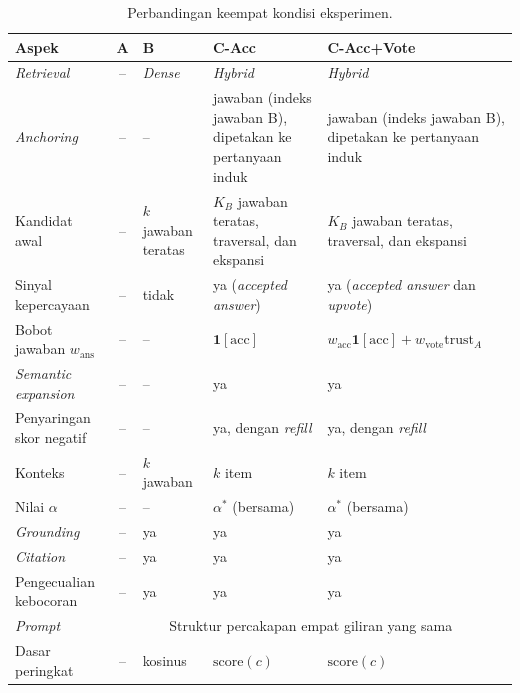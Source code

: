 \begin{table}[!htbp]
\centering
\small
\caption{Perbandingan keempat kondisi eksperimen.}
\label{tab:perbandingan-kondisi}
\renewcommand{\arraystretch}{1.2}
\begin{tabularx}{\textwidth}{|>{\raggedright\arraybackslash}p{2.9cm}|c|>{\centering\arraybackslash}X|>{\centering\arraybackslash}X|>{\centering\arraybackslash}X|}
\hline
\textbf{Aspek} & \textbf{A} & \textbf{B} & \textbf{C-Acc} & \textbf{C-Acc+Vote} \\
\hline
\emph{Retrieval} & -- & \emph{Dense} & \emph{Hybrid} & \emph{Hybrid} \\
\emph{Anchoring} & -- & -- & jawaban (indeks jawaban B), dipetakan ke pertanyaan induk & jawaban (indeks jawaban B), dipetakan ke pertanyaan induk \\
Kandidat awal & -- & $k$ jawaban teratas & $K_B$ jawaban teratas, traversal, dan ekspansi & $K_B$ jawaban teratas, traversal, dan ekspansi \\
Sinyal kepercayaan & -- & tidak & ya (\emph{accepted answer}) & ya (\emph{accepted answer} dan \emph{upvote}) \\
Bobot jawaban $w_{\mathrm{ans}}$ & -- & -- & $\mathbf{1}[\mathrm{acc}]$ & $w_{\mathrm{acc}}\mathbf{1}[\mathrm{acc}]+w_{\mathrm{vote}}\mathrm{trust}_A$ \\
\emph{Semantic expansion} & -- & -- & ya & ya \\
Penyaringan skor negatif & -- & -- & ya, dengan \emph{refill} & ya, dengan \emph{refill} \\
Konteks & -- & $k$ jawaban & $k$ item & $k$ item \\
Nilai $\alpha$ & -- & -- & $\alpha^{*}$ (bersama) & $\alpha^{*}$ (bersama) \\
\emph{Grounding} & -- & ya & ya & ya \\
\emph{Citation} & -- & ya & ya & ya \\
Pengecualian kebocoran & -- & ya & ya & ya \\
\emph{Prompt} & \multicolumn{4}{c|}{Struktur percakapan empat giliran yang sama} \\
Dasar peringkat & -- & kosinus & $\mathrm{score}(c)$ & $\mathrm{score}(c)$ \\
\hline
\end{tabularx}
\end{table}